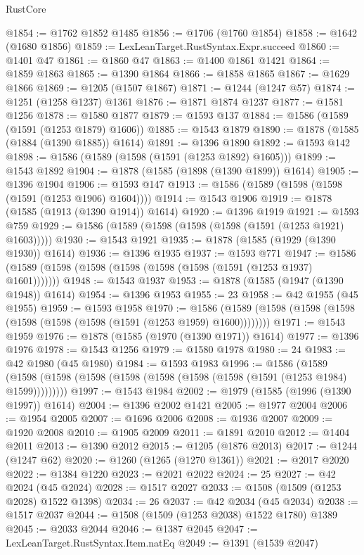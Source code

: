 \begin{lexlean}{RustCore}
\begin{coremodule}
@1854 := @1762 @1852 @1485
@1856 := @1706 (@1760 @1854)
@1858 := @1642 (@1680 @1856)
@1859 := LexLeanTarget.RustSyntax.Expr.succeed
@1860 := @1401 @47
@1861 := @1860 @47
@1863 := @1400 @1861 @1421
@1864 := @1859 @1863
@1865 := @1390 @1864
@1866 := @1858 @1865
@1867 := @1629 @1866
@1869 := @1205 (@1507 @1867)
@1871 := @1244 (@1247 @57)
@1874 := @1251 (@1258 @1237) @1361
@1876 := @1871 @1874 @1237
@1877 := @1581 @1256
@1878 := @1580 @1877
@1879 := @1593 @137
@1884 := @1586 (@1589 (@1591 (@1253 @1879) @1606))
@1885 := @1543 @1879
@1890 := @1878 (@1585 (@1884 (@1390 @1885)) @1614)
@1891 := @1396 @1890
@1892 := @1593 @142
@1898 := @1586 (@1589 (@1598 (@1591 (@1253 @1892) @1605)))
@1899 := @1543 @1892
@1904 := @1878 (@1585 (@1898 (@1390 @1899)) @1614)
@1905 := @1396 @1904
@1906 := @1593 @147
@1913 := @1586 (@1589 (@1598 (@1598 (@1591 (@1253 @1906) @1604))))
@1914 := @1543 @1906
@1919 := @1878 (@1585 (@1913 (@1390 @1914)) @1614)
@1920 := @1396 @1919
@1921 := @1593 @759
@1929 := @1586 (@1589 (@1598 (@1598 (@1598 (@1591 (@1253 @1921) @1603)))))
@1930 := @1543 @1921
@1935 := @1878 (@1585 (@1929 (@1390 @1930)) @1614)
@1936 := @1396 @1935
@1937 := @1593 @771
@1947 := @1586 (@1589 (@1598 (@1598 (@1598 (@1598 (@1598 (@1591 (@1253 @1937) @1601)))))))
@1948 := @1543 @1937
@1953 := @1878 (@1585 (@1947 (@1390 @1948)) @1614)
@1954 := @1396 @1953
@1955 := 23
@1958 := @42 @1955 (@45 @1955)
@1959 := @1593 @1958
@1970 := @1586 (@1589 (@1598 (@1598 (@1598 (@1598 (@1598 (@1598 (@1591 (@1253 @1959) @1600))))))))
@1971 := @1543 @1959
@1976 := @1878 (@1585 (@1970 (@1390 @1971)) @1614)
@1977 := @1396 @1976
@1978 := @1543 @1256
@1979 := @1580 @1978
@1980 := 24
@1983 := @42 @1980 (@45 @1980)
@1984 := @1593 @1983
@1996 := @1586
    (@1589 (@1598 (@1598 (@1598 (@1598 (@1598 (@1598 (@1598 (@1591 (@1253 @1984) @1599)))))))))
@1997 := @1543 @1984
@2002 := @1979 (@1585 (@1996 (@1390 @1997)) @1614)
@2004 := @1396 @2002 @1421
@2005 := @1977 @2004
@2006 := @1954 @2005
@2007 := @1696 @2006
@2008 := @1936 @2007
@2009 := @1920 @2008
@2010 := @1905 @2009
@2011 := @1891 @2010
@2012 := @1404 @2011
@2013 := @1390 @2012
@2015 := @1205 (@1876 @2013)
@2017 := @1244 (@1247 @62)
@2020 := @1260 (@1265 (@1270 @1361))
@2021 := @2017 @2020
@2022 := @1384 @1220
@2023 := @2021 @2022
@2024 := 25
@2027 := @42 @2024 (@45 @2024)
@2028 := @1517 @2027
@2033 := @1508 (@1509 (@1253 @2028) @1522 @1398)
@2034 := 26
@2037 := @42 @2034 (@45 @2034)
@2038 := @1517 @2037
@2044 := @1508 (@1509 (@1253 @2038) @1522 @1780) @1389
@2045 := @2033 @2044
@2046 := @1387 @2045
@2047 := LexLeanTarget.RustSyntax.Item.natEq
@2049 := @1391 (@1539 @2047)

\end{coremodule}
\end{lexlean}

